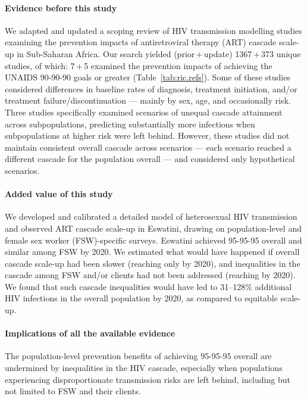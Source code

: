\newcommand{\pu}[2]{#1\,+\,#2}
\begin{ric}[b]
  \paragraph{Evidence before this study}
  We adapted and updated a scoping review of HIV transmission modelling studies examining
  the prevention impacts of antiretroviral therapy (ART) cascade scale-up in Sub-Saharan Africa.
  Our search yielded (\pu{prior}{update}) \pu{1367}{373} unique studies, of which:
  \pu{7}{5} examined the prevention impacts of achieving
  the UNAIDS 90-90-90 goals or greater (Table~\ref{tab:ric.refs}).
  Some of these studies considered differences in baseline rates of
  diagnosis, treatment initiation, and/or treatment failure/discontinuation
  --- mainly by sex, age, and occasionally risk.
  Three studies specifically examined scenarios of unequal cascade attainment across subpopulations,
  predicting substantially more infections when subpopulations at higher risk were left behind.
    However, these studies did not maintain consistent overall cascade across scenarios
  --- \ie each scenario reached a different cascade for the population overall ---
  and considered only hypothetical scenarios.
  \paragraph{Added value of this study}
  We developed and calibrated a detailed model of heterosexual HIV transmission
  and observed ART cascade scale-up in Eswatini,
  drawing on population-level and female sex worker (FSW)-specific surveys.
  Eswatini achieved 95-95-95 overall and similar among FSW by 2020.
  We estimated what would have happened if
  overall cascade scale-up had been slower
  (reaching only \casmd by 2020), and
  inequalities in the cascade among FSW and/or clients had not been addressed
  (reaching \caslo by 2020).
  We found that such cascade inequalities
  would have led to 31--128\% additional HIV infections in the overall population by 2020, %
  as compared to equitable scale-up.
  \paragraph{Implications of all the available evidence}
  The population-level prevention benefits of achieving 95-95-95 overall
  are undermined by inequalities in the HIV cascade, especially when
  populations experiencing disproportionate transmission risks are left behind,
  including but not limited to FSW and their clients.
\end{ric}
